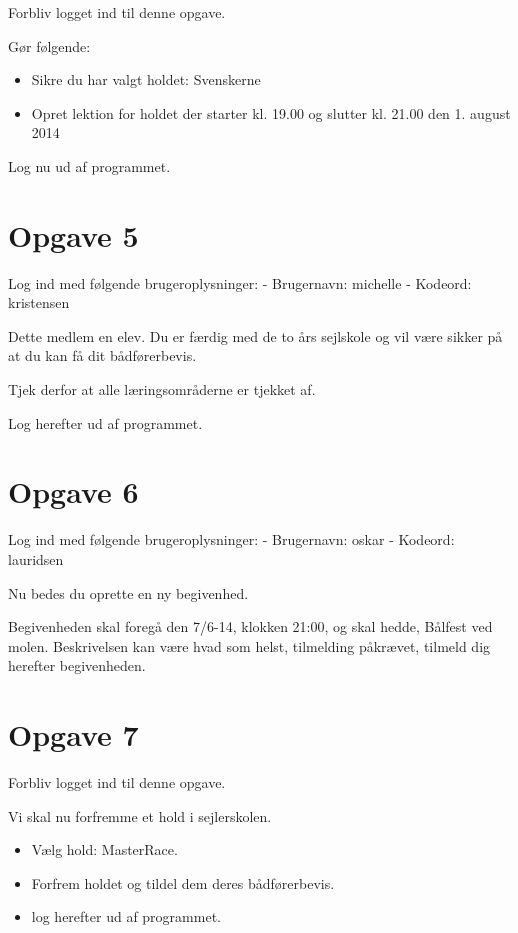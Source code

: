 Forbliv logget ind til denne opgave.

Gør følgende:
\begin{itemize}
\item Sikre du har valgt holdet: Svenskerne
\item Opret lektion for holdet der starter kl. 19.00 og slutter kl. 21.00 den 1. august 2014
\end{itemize}

Log nu ud af programmet.

\section{Opgave 5}

Log ind med følgende brugeroplysninger: 
\newline - Brugernavn: michelle
\newline - Kodeord: kristensen

Dette medlem en elev. Du er færdig med de to års sejlskole og vil være sikker på at du kan få dit bådførerbevis.

Tjek derfor at alle læringsområderne er tjekket af.

Log herefter ud af programmet.


\section{Opgave 6}

Log ind med følgende brugeroplysninger: 
\newline - Brugernavn: oskar
\newline - Kodeord: lauridsen

Nu bedes du oprette en ny begivenhed.

Begivenheden skal foregå den 7/6-14, klokken 21:00, og skal hedde, Bålfest ved molen. Beskrivelsen kan være hvad som helst, tilmelding påkrævet, tilmeld dig herefter begivenheden.


\section{Opgave 7}

Forbliv logget ind til denne opgave.

Vi skal nu forfremme et hold i sejlerskolen.

\begin{itemize}
\item Vælg hold: MasterRace.
\item Forfrem holdet og tildel dem deres bådførerbevis.
\item log herefter ud af programmet.
\end{itemize}


